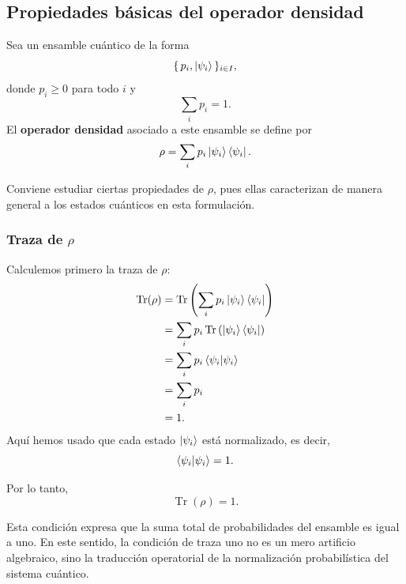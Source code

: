 \documentclass[12pt,a4paper]{article}
\theoremstyle{definition}
\theoremstyle{plain}
\theoremstyle{remark}
\begin{document}

\subsection{Propiedades básicas del \textbf{operador densidad}}

Sea un ensamble cuántico de la forma
\begin{equation*}
    \{\,p_i,\ket{\psi_i}\,\}_{i\in I},
\end{equation*}
donde $p_i\geq 0$ para todo $i$ y
\begin{equation*}
    \sum_i p_i = 1.
\end{equation*}
El \textbf{operador densidad} asociado a este ensamble se define por
\begin{equation*}
    \rho = \sum_i p_i \ket{\psi_i}\bra{\psi_i}.
\end{equation*}

Conviene estudiar ciertas propiedades de $\rho$, pues ellas caracterizan de manera general a los estados cuánticos en esta formulación.

\subsubsection*{Traza de $\rho$}

Calculemos primero la traza de $\rho$:
\begin{align*}
    \operatorname{Tr}(\rho)
    &= \operatorname{Tr}\left(\sum_i p_i \ket{\psi_i}\bra{\psi_i}\right) \\
    &= \sum_i p_i \operatorname{Tr}\left(\ket{\psi_i}\bra{\psi_i}\right) \\
    &= \sum_i p_i \braket{\psi_i|\psi_i} \\
    &= \sum_i p_i \\
    &= 1.
\end{align*}
Aquí hemos usado que cada estado $\ket{\psi_i}$ está normalizado, es decir,
\begin{equation*}
    \braket{\psi_i|\psi_i}=1.
\end{equation*}

Por lo tanto,
\begin{equation*}
    \operatorname{Tr}(\rho)=1.
\end{equation*}

Esta condición expresa que la suma total de probabilidades del ensamble es igual a uno. En este sentido, la condición de traza uno no es un mero artificio algebraico, sino la traducción operatorial de la normalización probabilística del sistema cuántico.
\end{document}
